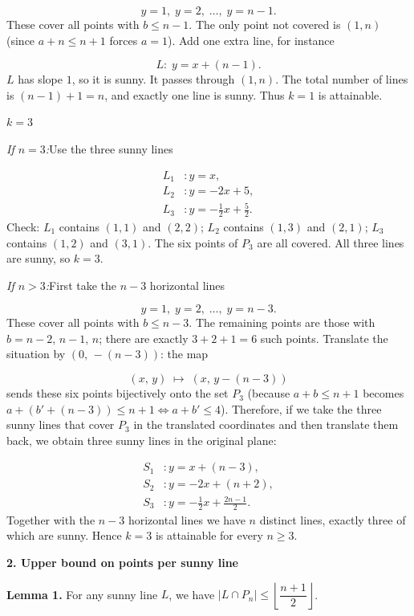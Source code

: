 \documentclass{llmxive}
\providecommand{\solutionheading}[1]{\par\smallskip\noindent\textbf{#1}\par}
\begin{document}
\[
y = 1,\; y = 2,\; \dots,\; y = n-1.
\]
These cover all points with \(b \le n-1\). The only point not covered is \((1,n)\) (since \(a+n\le n+1\) forces \(a = 1\)). Add one extra line, for instance\par
\[
L:\; y = x + (n-1).
\]
\(L\) has slope \(1\), so it is sunny. It passes through \((1,n)\). The total number of lines is \((n-1)+1 = n\), and exactly one line is sunny. Thus \(k = 1\) is attainable.\par
\solutionheading{\(k = 3\)}
\emph{If \(n = 3\):}Use the three sunny lines\par
\[
\begin{aligned}
L_1 &: y = x,\\
L_2 &: y = -2x + 5,\\
L_3 &: y = -\tfrac12 x + \tfrac52.
\end{aligned}
\]
Check: \(L_1\) contains \((1,1)\) and \((2,2)\); \(L_2\) contains \((1,3)\) and \((2,1)\); \(L_3\) contains \((1,2)\) and \((3,1)\). The six points of \(P_3\) are all covered. All three lines are sunny, so \(k = 3\).\par
\emph{If \(n > 3\):}First take the \(n-3\) horizontal lines\par
\[
y = 1,\; y = 2,\; \dots,\; y = n-3.
\]
These cover all points with \(b \le n-3\). The remaining points are those with \(b = n-2,\, n-1,\, n\); there are exactly \(3+2+1 = 6\) such points. Translate the situation by \((0,\,-(n-3))\): the map\par
\[
(x,\,y) \;\longmapsto\; (x,\,y-(n-3))
\]
sends these six points bijectively onto the set \(P_3\) (because \(a+b \le n+1\) becomes \(a + (b'+(n-3)) \le n+1 \iff a+b' \le 4\)). Therefore, if we take the three sunny lines that cover \(P_3\) in the translated coordinates and then translate them back, we obtain three sunny lines in the original plane:\par
\[
\begin{aligned}
S_1 &: y = x + (n-3),\\
S_2 &: y = -2x + (n+2),\\
S_3 &: y = -\tfrac12 x + \tfrac{2n-1}{2}.
\end{aligned}
\]
Together with the \(n-3\) horizontal lines we have \(n\) distinct lines, exactly three of which are sunny. Hence \(k = 3\) is attainable for every \(n\ge 3\).\par
\smallskip
\solutionheading{2. Upper bound on points per sunny line}
\textbf{Lemma 1.} For any sunny line \(L\), we have \(|L \cap P_n| \le \left\lfloor\dfrac{n+1}{2}\right\rfloor\).\par
\end{document}
